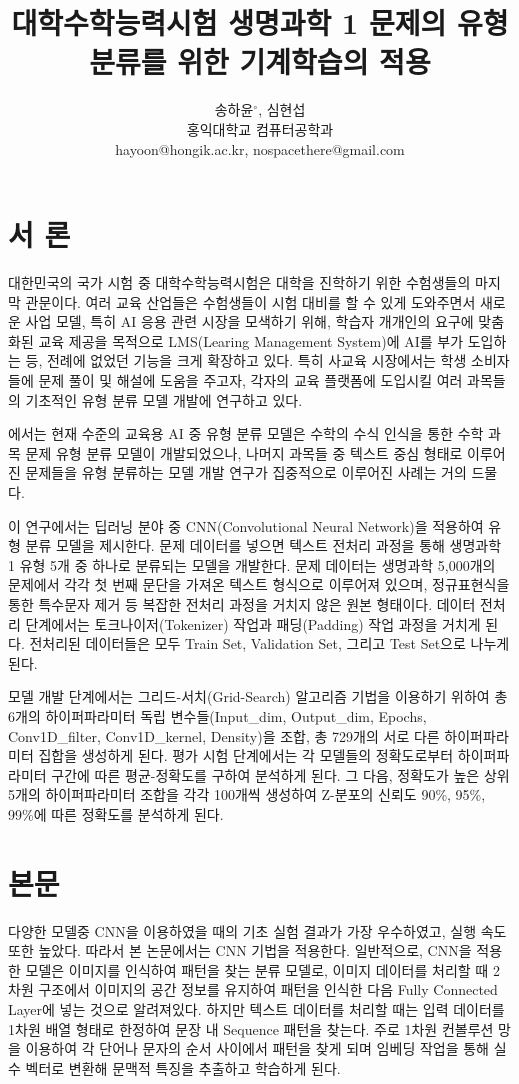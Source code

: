 \documentclass{kcc}
\title{대학수학능력시험 생명과학 1 문제의 유형 분류를 위한 기계학습의 적용}
\author{
송하윤$^{\circ}$, 심현섭\\
홍익대학교 컴퓨터공학과\\
hayoon@hongik.ac.kr, nospacethere@gmail.com
}
\begin{document}
\maketitle


\section{서 론}
대한민국의 국가 시험 중 대학수학능력시험은 대학을 진학하기 위한 수험생들의 마지막 관문이다. 
여러 교육 산업들은 수험생들이 시험 대비를 할 수 있게 도와주면서 새로운 사업 모델, 특히 AI 응용 관련 시장을 모색하기 위해, 
학습자 개개인의 요구에 맞춤화된 교육 제공을 목적으로 LMS(Learing Management System)\cite{cite:lms}에 AI를 부가 도입하는 등, 전례에 없었던 기능을 크게 확장하고 있다.
특히 사교육 시장에서는 학생 소비자들에 문제 풀이 및 해설에 도움을 주고자, 각자의 교육 플랫폼에 도입시킬 여러 과목들의 기초적인 유형 분류 모델 개발에 연구하고 있다.

\cite{cite:handwriting1}에서는
현재 수준의 교육용 AI 중 유형 분류 모델은 수학의 수식 인식\cite{cite:MathFormulaRecognition}을 통한 수학 과목 문제 유형 분류 모델이 개발되었으나, 
나머지 과목들 중 텍스트 중심 형태로 이루어진 문제들을 유형 분류하는 모델 개발 연구가 집중적으로 이루어진 사례는 거의 드물다.

이 연구에서는 딥러닝 분야 중 CNN(Convolutional Neural Network)을 적용하여 유형 분류 모델을 제시한다. 문제 데이터를 넣으면 텍스트 전처리 과정을 통해 생명과학 1 유형 5개 중 하나로 분류되는 모델을 개발한다. 문제 데이터는 생명과학 5,000개의 문제에서 각각 첫 번째 문단을 가져온 텍스트 형식으로 이루어져 있으며, 정규표현식을 통한 특수문자 제거 등 복잡한 전처리 과정을 거치지 않은 원본 형태이다.
데이터 전처리 단계에서는 토크나이저(Tokenizer) 작업과 패딩(Padding) 작업 과정을 거치게 된다. 전처리된 데이터들은 모두 Train Set, Validation Set, 그리고 Test Set으로 나누게 된다.

모델 개발 단계에서는 그리드-서치(Grid-Search) 알고리즘 기법을 이용하기 위하여 총 6개의 하이퍼파라미터 독립 변수들(Input\_dim, Output\_dim, Epochs, Conv1D\_filter, Conv1D\_kernel, Density)을 조합, 총 729개의 서로 다른 하이퍼파라미터 집합을 생성하게 된다. 
평가 시험 단계에서는 각 모델들의 정확도로부터 하이퍼파라미터 구간에 따른 평균-정확도를 구하여 분석하게 된다. 그 다음, 정확도가 높은 상위 5개의 하이퍼파라미터 조합을 각각 100개씩 생성하여 Z-분포의 신뢰도 90\%, 95\%, 99\%에 따른 정확도를 분석하게 된다.

\section{본문}
다양한 모델중 CNN을 이용하였을 때의 기초 실험 결과가 가장 우수하였고, 실행 속도 또한 높았다. 따라서 본 논문에서는 CNN 기법을 적용한다. 일반적으로, CNN을 적용한 모델은 이미지를 인식하여 패턴을 찾는 분류 모델\cite{cite:TextRecognition1}로, 이미지 데이터를 처리할 때 2차원 구조에서 이미지의 공간 정보\cite{cite:cui2024deep}를 유지하여 패턴을 인식한 다음 Fully Connected Layer에 넣는 것으로 알려져있다. 하지만 텍스트 데이터를 처리할 때는 입력 데이터를 1차원 배열 형태로 한정하여 문장 내 Sequence 패턴\cite{cite:textClassification1}을 찾는다. 주로 1차원 컨볼루션 망을 이용하여 각 단어나 문자의 순서 사이에서 패턴을 찾게 되며 임베딩 작업을 통해 실수 벡터로 변환해 문맥적 특징을 추출하고 학습하게 된다.
\end{document}
